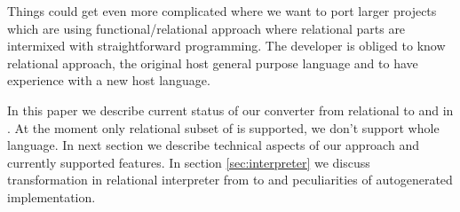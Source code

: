 Things could get even more complicated where we want to port larger projects which are using functional/relational approach where relational parts are intermixed with straightforward programming.
The developer is obliged to know relational approach, the original host general purpose language and to have experience  with a new host language.

In this paper we describe current status of our converter from relational \OCanren{} to \Klogic{} and \miniKanren{} in \Scheme{}.
At the moment only relational subset of \OCanren{} is supported, we don't support whole \OCaml{} language.
In next section we describe technical aspects of our approach and currently supported features.
In section \ref{sec:interpreter} we discuss transformation in relational interpreter from \OCanren{} to \Scheme{} and peculiarities of autogenerated implementation.


